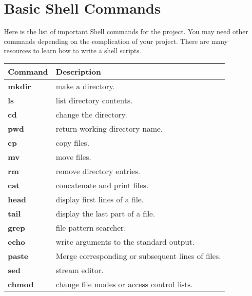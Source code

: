 \section{Basic Shell Commands}

Here is the list of important Shell commands for the project. You may need other commands depending on the complication of your project. There are many resources to learn how to write a shell scripts. \\


\begin{table}[h]

\begin{tabular}{ m{2cm}  m{12cm} }

\hline
 \textbf{Command}          &  \textbf{Description}    \\ 
\hline
 \textbf{mkdir}          & make a directory.  \\ 
 \textbf{ls}                & list directory contents.  \\ 
 \textbf{cd}               & change the directory.\\
 \textbf{pwd}            & return working directory name. \\
 \textbf{cp}               & copy files. \\ 
 \textbf{mv}              & move files. \\ 
 \textbf{rm}               & remove directory entries. \\ 
 \textbf{cat}              & concatenate and print files. \\    
 \textbf{head}           & display first lines of a file.\\
 \textbf{tail}              & display the last part of a file. \\
 \textbf{grep}            & file pattern searcher. \\   
 \textbf{echo}           & write arguments to the standard output. \\
 \textbf{paste}          & Merge corresponding or subsequent lines of files. \\
 \textbf{sed}             & stream editor. \\   
 \textbf{chmod}        & change file modes or access control lists.\\ 
 \hline
 \end{tabular}
\label{tab:b_k_m_param}
\end{table}

